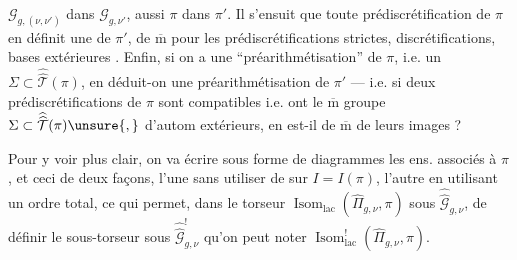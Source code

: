 
 $\mathcal G_{g,(\nu,\nu')}$ dans $\mathcal G_{g,\nu'}$, aussi $\pi$ dans $\pi'$. Il s'ensuit que toute prédiscrétification de $\pi$ en définit une de $\pi'$, de $\overline{\mathrm m}$ pour les prédiscrétifications strictes,  discrétifications, bases extérieures . Enfin, si on a une ``préarithmétisation'' de $\pi$, i.e. un $\Sigma\subset\widehat{\widehat{\mathcal T}}(\pi)$, en déduit-on une préarithmétisation de $\pi'$ --- i.e.  si deux prédiscrétifications de $\pi$ sont compatibles i.e.  ont le $\overline{\mathrm m}$ groupe $\Sigma\subset\widehat{\widehat{\mathcal T}}(\pi)\unsure{,}$ d'autom extérieurs, en est-il de $\overline{\mathrm m}$ de leurs images ?


Pour y voir plus clair, on va écrire sous forme de diagrammes les ens.   associés à $\pi$, et ceci de deux façons, l'une sans utiliser de  sur $I=I(\pi)$, l'autre en utilisant un ordre total, ce qui permet, dans le torseur $\operatorname{Isom}_{\mathrm{lac}}(\widehat\Pi_{g,\nu},\pi)$ sous $\widehat{\widehat{\mathcal G}}_{g,\nu}$, de définir le sous-torseur sous $\widehat{\widehat{\mathcal G}}_{g,\nu}^{!}$ qu'on peut noter  $\operatorname{Isom}_{\mathrm{lac}}^{!}(\widehat\Pi_{g,\nu},\pi)$.


